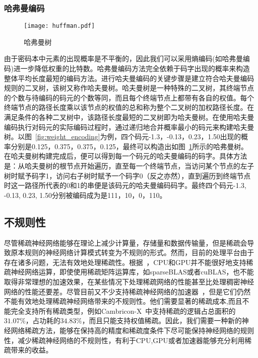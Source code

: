 \subsubsection{哈弗曼编码}

\begin{figure}[h]
\centering
\texttt{[image: huffman.pdf]}
\caption{哈弗曼树}
\label{fig:huffman}
\end{figure}

由于密码本中元素的出现概率是不平衡的，因此我们可以采用熵编码(如哈弗曼编码)进一步降低权重的比特数。哈弗曼编码方法完全依赖于码字出现的概率来构造整体平均长度最短的编码方法。进行哈夫曼编码的关键步骤是建立符合哈夫曼编码规则的二叉树，该树又称作哈夫曼树。哈夫曼树是一种特殊的二叉树，其终端节点的个数与待编码的码元的个数等同，而且每个终端节点上都带有各自的权值。每个终端节点的路径长度乘以该节点的权值的总和称为整个二叉树的加权路径长度。在满足条件的各种二叉树中，该路径长度最短的二叉树即为哈夫曼树。在使用哈夫曼编码执行对码元的实际编码过程时，通过递归地合并概率最小的码元来构建哈夫曼树。以图~\ref{fig:weight_encoding}为例，四个码元-1.3，-0.13，0.23，1.50出现的概率分别是0.125，0.375，0.375，0.125，最终可以构造出如图~\ref{fig:huffman}所示的哈弗曼树。在哈夫曼树构建完成后，便可以得到每一个码元的哈夫曼编码的码字。具体方法是：从哈夫曼树的根节点开始遍历，直至每一个终端节点，当访问某个节点的左子树时赋予码字1，访问右子树时赋予一个码字0（反之亦然），直到遍历到终端节点时这一路径所代表的0和1的串便是该码元的哈夫曼编码码字。最终四个码元-1.3, -0.13, 0.23, 1.50分别被编码成为是111，10，0，110。

\subsection{不规则性}
尽管稀疏神经网络能够在理论上减少计算量，存储量和数据传输量，但是稀疏会导致原本规则的神经网络计算模式转变为不规则的形式。然而，目前的处理平台由于存在诸多问题，无法有效地处理稀疏性。根据~\cite{zhang2016cambricon}，CPU和GPU并不能很好地支持稀疏神经网络运算，即使使用稀疏矩阵运算库，如sparseBLAS或者cuBLAS，也不能取得非常理想的加速效果，在某些情况下处理稀疏网络的性能甚至比处理稠密神经网络的性能还要差。尽管目前又不少支持稀疏神经网络的加速器~\cite{zhang2016cambricon, albericio2016cnvlutin, han2016eie, han2017ese, angshuman2017scnn}，但是它们仍然不能有效地处理稀疏神经网络带来的不规则性。他们需要显著的稀疏成本,而且不能完全支持所有稀疏类型，例如Cambricon-X~\cite{zhang2016cambricon}中支持稀疏的逻辑占总面积的$31.07\%$，占功耗的$34.83\%$，而且只能支持权值稀疏。因此，我们需要一种新的神经网络稀疏方法，能够在保持高的精度和稀疏度条件下尽可能保持神经网络的规则性，减少稀疏神经网络的不规则性，有利于CPU,GPU或者加速器能够充分利用稀疏带来的收益。



